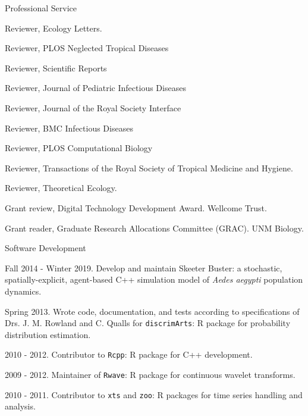 \documentclass{resume} %
\begin{document}
\begin{rSection}{Professional Service}
\item Reviewer, Ecology Letters.
\item Reviewer, PLOS Neglected Tropical Diseases
\item Reviewer, Scientific Reports
\item Reviewer, Journal of Pediatric Infectious Diseases
\item Reviewer, Journal of the Royal Society Interface
\item Reviewer, BMC Infectious Diseases
\item Reviewer, PLOS Computational Biology
\item Reviewer, Transactions of the Royal Society of Tropical Medicine and Hygiene.
\item Reviewer, Theoretical Ecology.
\item Grant review, Digital Technology Development Award. Wellcome Trust.
\item Grant reader, Graduate Research Allocations Committee (GRAC). UNM Biology.
\end{rSection}

\begin{rSection}{Software Development}
\item Fall 2014 - Winter 2019. Develop and maintain Skeeter Buster: a stochastic,
spatially-explicit, agent-based C++ simulation model of {\em Aedes aegypti}
population dynamics.
\item Spring 2013. Wrote code, documentation, and tests according to
specifications of Drs. J. M. Rowland and C. Qualls for \texttt{discrimArts}: R package for probability
distribution estimation.
\item 2010 - 2012. Contributor to \texttt{Rcpp}: R package for C++ development.
\item 2009 - 2012. Maintainer of \texttt{Rwave}: R package for continuous wavelet transforms.
\item 2010 - 2011. Contributor to \texttt{xts} and \texttt{zoo}: R packages for time series handling and analysis.
\end{rSection}
\end{document}
